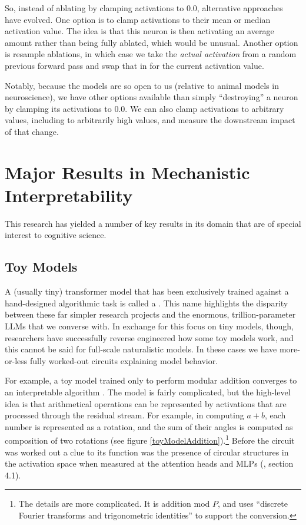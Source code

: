 So, instead of ablating by clamping activations to $0.0$, alternative
approaches have evolved. One option is to clamp activations to their mean or
median activation value. The idea is that this neuron is then activating an
average amount rather than being fully ablated, which would be unusual. Another
option is resample ablations, in which case we take the \emph{actual
activation} from a random previous forward pass and swap that in for the
current activation value.

Notably, because the models are so open to us (relative to animal models in
neuroscience), we have other options available than simply ``destroying'' a
neuron by  clamping its activations to  $0.0$. We can also clamp activations to
arbitrary values, including to arbitrarily high values, and measure the
downstream impact of that change.

\section{Major Results in Mechanistic Interpretability}

This research has yielded a number of key results in
its domain that are of special interest to cognitive science.

\subsection{Toy Models}

A (usually tiny) transformer model that has been exclusively trained against a
hand-designed algorithmic task is called a . This name
highlights the disparity between these far simpler research projects and the
enormous, trillion-parameter LLMs that we converse with. In exchange for this
focus on tiny models, though, researchers have successfully reverse engineered
how some toy models work, and this cannot be said for full-scale naturalistic
models. In these cases we have more-or-less fully worked-out circuits
explaining model behavior.

For example, a toy model trained only to perform modular addition converges to
an interpretable algorithm \cite{nanda2023progress}. The model is fairly
complicated, but the high-level idea is that arithmetical operations can be
represented by activations that are processed through the residual stream. For
example, in computing $a + b$, each number is represented as a rotation, and
the sum of their angles is computed as composition of two rotations (see figure
\ref{toyModelAddition}).\footnote{The details are more complicated. It is
addition mod $P$, and uses ``discrete Fourier transforms and trigonometric
identities'' \cite{nanda2023progress} to support the conversion.} Before the
circuit was worked out a clue to its function was the presence of circular
structures in the activation space when measured at the attention heads and
MLPs (\cite{nanda2023progress}, section 4.1).

